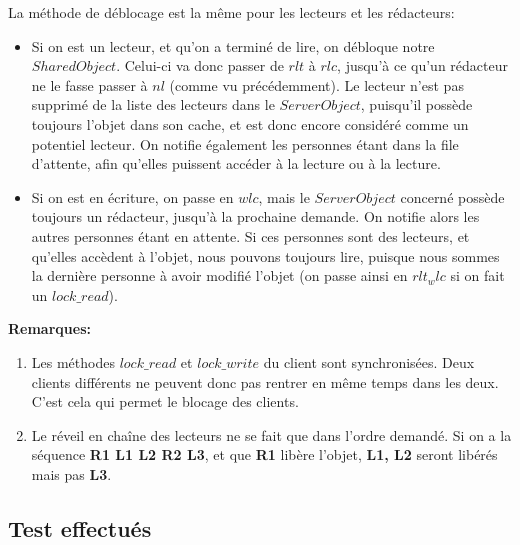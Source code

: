 \documentclass[11pt,a4paper]{report}
\begin{document}
La méthode de déblocage est la même pour les lecteurs et les rédacteurs: 
\begin{itemize}
\item Si on est un lecteur, et qu'on a terminé de lire, on débloque notre $SharedObject$. Celui-ci va donc passer de $rlt$ à $rlc$, jusqu'à ce qu'un rédacteur ne le fasse passer à $nl$ (comme vu précédemment). Le lecteur n'est pas supprimé de la liste des lecteurs dans le $ServerObject$, puisqu'il possède toujours l'objet dans son cache, et est donc encore considéré comme un potentiel lecteur. On notifie également les personnes étant dans la file d'attente, afin qu'elles puissent accéder à la lecture ou à la lecture.
\item Si on est en écriture, on passe en $wlc$, mais le $ServerObject$ concerné possède toujours un rédacteur, jusqu'à la prochaine demande. On notifie alors les autres personnes étant en attente. Si ces personnes sont des lecteurs, et qu'elles accèdent à l'objet, nous pouvons toujours lire, puisque nous sommes la dernière personne à avoir modifié l'objet (on passe ainsi en $rlt_wlc$ si on fait un $lock\_read$).
\end{itemize}

\textbf{Remarques:}
\begin{enumerate}
\item Les méthodes $lock\_read$ et $lock\_write$ du client sont synchronisées. Deux clients différents ne peuvent donc pas rentrer en même temps dans les deux. C'est cela qui permet le blocage des clients. 
\item Le réveil en chaîne des lecteurs ne se fait que dans l'ordre demandé. Si on a la séquence \textbf{R1 L1 L2 R2 L3}, et que \textbf{R1} libère l'objet, \textbf{L1, L2} seront libérés mais pas \textbf{L3}.
\end{enumerate}

\subsection{Test effectués}
\end{document}
